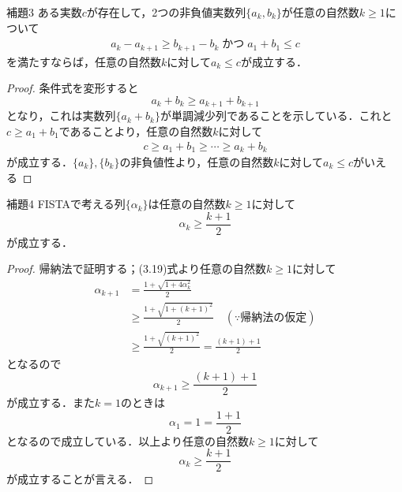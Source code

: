 \documentclass{jsarticle}
\theoremstyle{definition}
\theoremstyle{mystyle} %
\begin{document}
\begin{itembox}[l]{補題3}
ある実数$c$が存在して，2つの非負値実数列$\{a_k,b_k\}$が任意の自然数$k\geq 1$について
\begin{align*}
a_k-a_{k+1}\geq b_{k+1}-b_k\;かつ\; a_1+b_1\leq c
\end{align*}
を満たすならば，任意の自然数$k$に対して$a_k\leq c$が成立する．
\end{itembox}
\begin{proof}
条件式を変形すると
$$a_k+b_k\geq a_{k+1}+b_{k+1}$$
となり，これは実数列$\{a_k+b_k\}$が単調減少列であることを示している．これと$c\geq a_1+b_1$であることより，任意の自然数$k$に対して
\begin{align*}
c\geq a_1+b_1\geq \cdots \geq a_k+b_k
\end{align*}
が成立する．$\{a_k\},\{b_k\}$の非負値性より，任意の自然数$k$に対して$a_k\leq c$がいえる
\end{proof}

\begin{itembox}[l]{補題4}
FISTAで考える列$\{\alpha_k\}$は任意の自然数$k\geq 1$に対して
$$\alpha_k\geq \frac{k+1}{2}$$
が成立する．
\end{itembox}
\begin{proof}
帰納法で証明する；(3.19)式より任意の自然数$k\geq1$に対して
\begin{align*}
\alpha_{k+1}&=\frac{1+\sqrt{1+4\alpha_{k}^2}}{2}\\
&\geq \frac{1+\sqrt{1+(k+1)^2}}{2}\quad(\because 帰納法の仮定)\\
&\geq \frac{1+\sqrt{(k+1)^2}}{2}=\frac{(k+1)+1}{2}
\end{align*}
となるので
$$\alpha_{k+1}\geq \frac{(k+1)+1}{2}$$
が成立する．また$k=1$のときは
$$\alpha_1=1=\frac{1+1}{2}$$
となるので成立している．以上より任意の自然数$k\geq 1$に対して
$$\alpha_k\geq \frac{k+1}{2}$$
が成立することが言える．
\end{proof}
\end{document}
